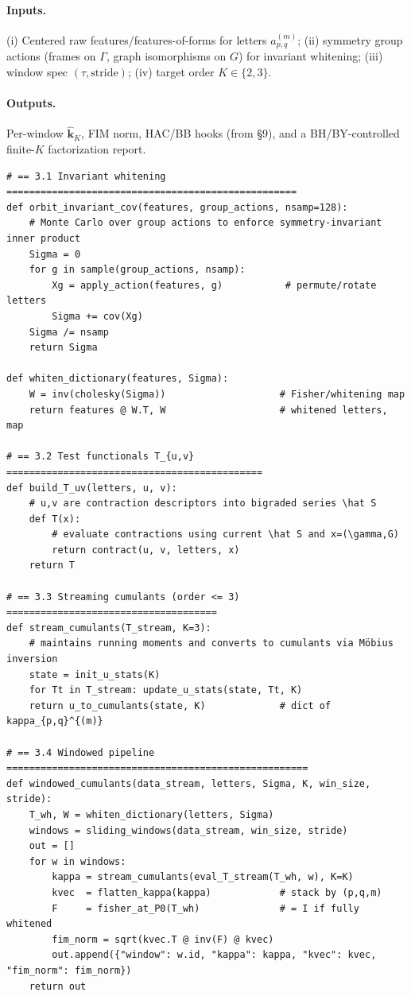 \documentclass[10pt]{article}
\begin{document}
\paragraph{Inputs.}
(i) Centered raw features/features-of-forms for letters $a^{(m)}_{p,q}$;  
(ii) symmetry group actions (frames on $\Gamma$, graph isomorphisms on $G$) for invariant whitening;  
(iii) window spec $(\tau,\text{stride})$; (iv) target order $K\in\{2,3\}$.

\paragraph{Outputs.}
Per-window $\widehat{\mathbf k}_K$, FIM norm, HAC/BB hooks (from §9), and a BH/BY-controlled finite-$K$ factorization report.

\begin{lstlisting}
# == 3.1 Invariant whitening ===================================================
def orbit_invariant_cov(features, group_actions, nsamp=128):
    # Monte Carlo over group actions to enforce symmetry-invariant inner product
    Sigma = 0
    for g in sample(group_actions, nsamp):
        Xg = apply_action(features, g)           # permute/rotate letters
        Sigma += cov(Xg)
    Sigma /= nsamp
    return Sigma

def whiten_dictionary(features, Sigma):
    W = inv(cholesky(Sigma))                    # Fisher/whitening map
    return features @ W.T, W                    # whitened letters, map

# == 3.2 Test functionals T_{u,v} =============================================
def build_T_uv(letters, u, v):
    # u,v are contraction descriptors into bigraded series \hat S
    def T(x): 
        # evaluate contractions using current \hat S and x=(\gamma,G)
        return contract(u, v, letters, x)
    return T

# == 3.3 Streaming cumulants (order <= 3) =====================================
def stream_cumulants(T_stream, K=3):
    # maintains running moments and converts to cumulants via Möbius inversion
    state = init_u_stats(K)
    for Tt in T_stream: update_u_stats(state, Tt, K)
    return u_to_cumulants(state, K)             # dict of kappa_{p,q}^{(m)}

# == 3.4 Windowed pipeline =====================================================
def windowed_cumulants(data_stream, letters, Sigma, K, win_size, stride):
    T_wh, W = whiten_dictionary(letters, Sigma)
    windows = sliding_windows(data_stream, win_size, stride)
    out = []
    for w in windows:
        kappa = stream_cumulants(eval_T_stream(T_wh, w), K=K)
        kvec  = flatten_kappa(kappa)            # stack by (p,q,m)
        F     = fisher_at_P0(T_wh)              # = I if fully whitened
        fim_norm = sqrt(kvec.T @ inv(F) @ kvec)
        out.append({"window": w.id, "kappa": kappa, "kvec": kvec, "fim_norm": fim_norm})
    return out


\end{lstlisting}
\end{document}
